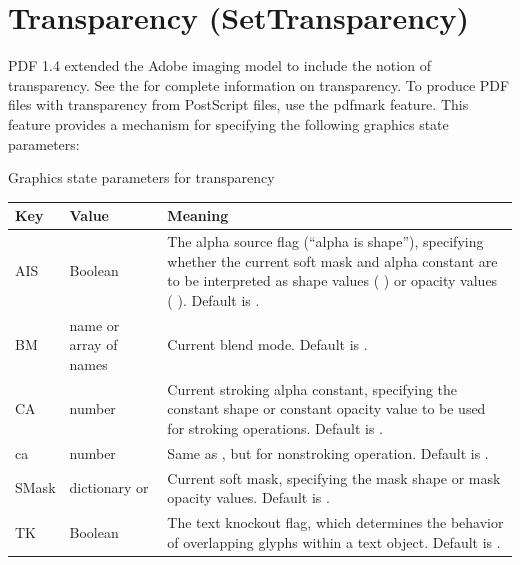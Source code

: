 \documentclass[letterpaper,12pt,english,openany,oneside]{sphinxmanual}
\begin{document}
\section{Transparency (SetTransparency)}
\label{\detokenize{pdfmark_Basic:transparency-settransparency}}
PDF 1.4 extended the Adobe imaging model to include the notion of transparency. See the  for complete information on transparency. To produce PDF files with transparency from PostScript files, use the  pdfmark feature. This feature provides a mechanism for specifying the following graphics state parameters:

Graphics state parameters for transparency


\begin{savenotes}\sphinxattablestart
\centering
{}\label{\detokenize{pdfmark_Basic:section-7}}\nobreak
\begin{tabulary}{\linewidth}[t]{|T|T|T|}
\hline
\sphinxstyletheadfamily 
Key
&\sphinxstyletheadfamily 
Value
&\sphinxstyletheadfamily 
Meaning
\\
\hline
AIS
&
Boolean
&
The alpha source flag (“alpha is shape”), specifying whether the current soft mask and alpha constant are to be interpreted as shape values ( ) or opacity values ( ). Default is  .
\\
\hline
BM
&
name or array of names
&
Current blend mode. Default is  .
\\
\hline
CA
&
number
&
Current stroking alpha constant, specifying the constant shape or constant opacity value to be used for stroking operations. Default is  .
\\
\hline
ca
&
number
&
Same as  , but for nonstroking operation. Default is  .
\\
\hline
SMask
&
dictionary or 
&
Current soft mask, specifying the mask shape or mask opacity values. Default is  .
\\
\hline
TK
&
Boolean
&
The text knockout flag, which determines the behavior of overlapping glyphs within a text object. Default is  .
\\
\hline
\end{tabulary}
\par
\sphinxattableend\end{savenotes}
\end{document}

